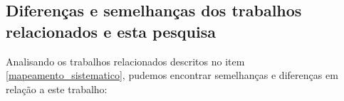 \begin{comment}
A literatura sugere que projetos maiores vão ter um prejuizo de produtividade devido à complexidade adicional trazida pelo seu tamanho. Realizar alterações em um projeto menor normalmente é mais fácil do que realizar alterações em projetos menores. Isso deveria ser considerado em um modelo como o nosso que tem como base uma estimação de produtividade.

Existem muitos problemas com os dados do GHTOrrent. O melhor teria sido obter apenas algumas informação de lá e o restante diretamente da API do GitHub.



É possível que a popularidade do projeto seja influenciada significativamente quando ele é desenvolvido por uma empresa grande. Ou seja,a causa de um projeto ter um alto número de estrelas não necessariamente é devido a relevância que a comunidade dá ao projeto. Ao invés disso, a popularidade do projeto pode ter sido obtida devido a popularidade da empresa. Um exemplo é o caso do projeto blitz4j que possui 504 estrelas. Enquanto isso, o projeto tinylog possui apenas 142. Entretanto, uma pesquisa em sites de buscas revelam que o tinylog é 4 vezes mais citado que o blitz4j. Logo, a maior quantidade de estrelas do blitz4j não reflete a sua popularidade entre os desenvolvedores.

\end{comment}

\subsection{Diferenças e semelhanças dos trabalhos relacionados e esta pesquisa}

Analisando os trabalhos relacionados descritos no item \ref{mapeamento_sistematico}, pudemos encontrar semelhanças e diferenças em relação a este trabalho:

